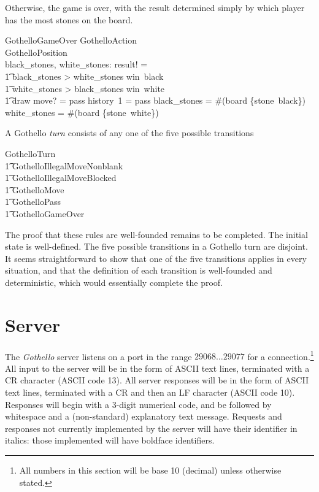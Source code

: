 \documentclass{article}
\begin{document}
Otherwise, the game is over, with the result determined
simply by which player has the most stones on the board.
\begin{schema}{GothelloGameOver}
  GothelloAction \\
  \Xi GothelloPosition \\
  black\_stones, white\_stones: \nat
\where
  result! = \\
  \t1 \IF black\_stones > white\_stones \THEN win~black \\
  \t1 \ELSE \IF white\_stones > black\_stones \THEN win~white \\
  \t1 \ELSE draw
\also
  move? = pass
\also
  history~1 = pass
\also
  black\_stones = \#(board \rres \{stone~black\})
\also
  white\_stones = \#(board \rres \{stone~white\})
\end{schema}

A Gothello {\em turn} consists of any one of the five
possible transitions
\begin{zed}
  GothelloTurn  \\
  \t1 GothelloIllegalMoveNonblank \lor \\
  \t1 GothelloIllegalMoveBlocked \lor \\
  \t1 GothelloMove \lor \\
  \t1 GothelloPass \lor \\
  \t1 GothelloGameOver \\
\end{zed}
The proof that these rules are well-founded remains to be
completed.  The initial state is well-defined.
The five possible transitions in a Gothello turn are
disjoint.  It seems straightforward to show that
one of the five transitions applies in every situation,
and that the definition of each transition is well-founded
and deterministic, which would essentially complete the
proof.

\clearpage
\section{Server}

The {\em Gothello} server listens on a port in the
range $29068\ldots29077$ for a
connection.\footnote{All numbers in this section
will be base 10 (decimal) unless otherwise stated.}
All input to the server will be in the form of
ASCII text lines, terminated with a CR character (ASCII code
13).  All server responses will be in the form of ASCII text
lines, terminated with a CR and then an LF character (ASCII
code 10).  Responses will begin with a 3-digit numerical
code, and be followed by whitespace and a (non-standard)
explanatory text message.  Requests and responses not currently
implemented by the server will have their identifier
in italics: those implemented will have boldface identifiers.
\end{document}
